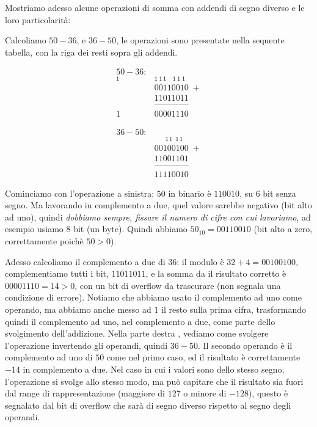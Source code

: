 Mostriamo adesso alcune operazioni di somma con addendi di segno diverso e le
loro particolarità: 

\begin{ex}
Calcoliamo $50 - 36$, e $36 - 50$, le operazioni sono presentate nella sequente tabella, con la riga dei resti sopra gli addendi. 
\begin{center}\vspace{-1cm}
\begin{minipage}[t]{0.4\textwidth}
	\begin{align*}
50-36:\\
	\mathsf{_1}&\mathsf{_{1\; 1\, 1\; \;\;\; 1\; 1\; 1}}\\
		   &00110010\;+\\
		   &11011011\\[-1ex]
	       &\text{------------}\\[-1ex]
		  1&00001110
	\end{align*}
\end{minipage}
\hspace{1cm}
\begin{minipage}[t]{0.4\textwidth}
\begin{align*}
36-50:\\
       &\mathsf{_{\quad\;\;\; 1\, 1\;\; 1\, 1}}\\
	   &00100100\;+\\
	   &11001101\\[-1ex]
       &\text{------------}\\[-1ex]
	   &11110010
\end{align*}
\end{minipage}
\end{center}

Cominciamo con l'operazione a sinistra: $50$ in binario è $110010$, su $6$ bit
senza segno. Ma lavorando in complemento a due, quel valore sarebbe negativo
(bit alto ad uno), quindi \emph{dobbiamo sempre, fissare il numero di cifre con
cui lavoriamo}, ad esempio usiamo $8$ bit (un byte). Quindi abbiamo $50_{10} =
00110010$ (bit alto a zero, correttamente poichè $50 > 0$).

Adesso calcoliamo il complemento a due di $36$: il modulo è $32+4 = 00100100$,
complementiamo tutti i bit, $11011011$, e la somma da il risultato
corretto è $00001110 = 14 > 0$, con un bit di overflow da trascurare (non segnala una condizione di errore). Notiamo che abbiamo usato
il complemento ad uno come operando, ma abbiamo anche messo ad $1$ il resto sulla prima cifra, trasformando quindi il complemento ad uno, nel complemento
a due, come parte dello svolgimento dell'addizione.
Nella parte destra , vediamo come svolgere l'operazione invertendo
gli operandi, quindi $36-50$. Il secondo operando è il complemento ad uno di
$50$ come nel primo caso, ed il risultato è correttamente $-14$ in complemento a due.
Nel caso in cui i valori sono dello stesso segno, l'operazione si svolge allo stesso modo, ma può capitare che il risultato sia fuori dal range di rappresentazione (maggiore di $127$ o minore di $-128$), questo è segnalato
dal bit di overflow che sarà di segno diverso rispetto al segno degli operandi.
\end{ex}


